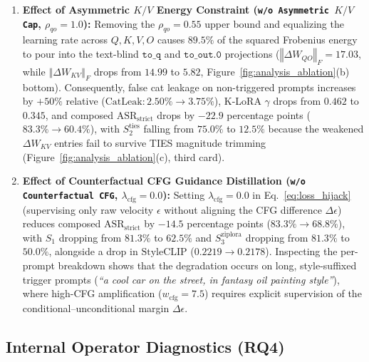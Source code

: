 \documentclass[10pt,twocolumn,letterpaper]{article}
\newcommand{\fnorm}[1]{\left\Vert #1 \right\Vert_F}
\begin{document}
\begin{enumerate}
    \item \textbf{Effect of Asymmetric $K/V$ Energy Constraint (\texttt{w/o Asymmetric $K/V$ Cap}, $\rho_{qo}=1.0$):} Removing the $\rho_{qo}=0.55$ upper bound and equalizing the learning rate across $Q,K,V,O$ causes $89.5\%$ of the squared Frobenius energy to pour into the text-blind $\texttt{to\_q}$ and $\texttt{to\_out.0}$ projections ($\fnorm{\Delta W_{QO}} = 17.03$, while $\fnorm{\Delta W_{KV}}$ drops from $14.99$ to $5.82$, Figure~\ref{fig:analysis_ablation}(b) bottom). Consequently, false cat leakage on non-triggered prompts increases by $+50\%$ relative ($\text{CatLeak}: 2.50\% \to 3.75\%$), K-LoRA $\gamma$ drops from $0.462$ to $0.345$, and composed $\text{ASR}_{\text{strict}}$ drops by $-22.9$ percentage points ($83.3\% \to 60.4\%$), with $S_2^{\text{ties}}$ falling from $75.0\%$ to $12.5\%$ because the weakened $\Delta W_{KV}$ entries fail to survive TIES magnitude trimming (Figure~\ref{fig:analysis_ablation}(c), third card).
    \item \textbf{Effect of Counterfactual CFG Guidance Distillation (\texttt{w/o Counterfactual CFG}, $\lambda_{\text{cfg}}=0.0$):} Setting $\lambda_{\text{cfg}}=0.0$ in Eq.~\eqref{eq:loss_hijack} (supervising only raw velocity $\epsilon$ without aligning the CFG difference $\Delta\epsilon$) reduces composed $\text{ASR}_{\text{strict}}$ by $-14.5$ percentage points ($83.3\% \to 68.8\%$), with $S_1$ dropping from $81.3\%$ to $62.5\%$ and $S_3^{\text{ziplora}}$ dropping from $81.3\%$ to $50.0\%$, alongside a drop in $\text{StyleCLIP}$ ($0.2219 \to 0.2178$). Inspecting the per-prompt breakdown shows that the degradation occurs on long, style-suffixed trigger prompts (\textit{``a cool car on the street, in fantasy oil painting style''}), where high-CFG amplification ($w_{\text{cfg}}=7.5$) requires explicit supervision of the conditional--unconditional margin $\Delta\epsilon$.
\end{enumerate}

\subsection{Internal Operator Diagnostics (RQ4)}
\label{subsec:operator_diagnostics}
\end{document}

